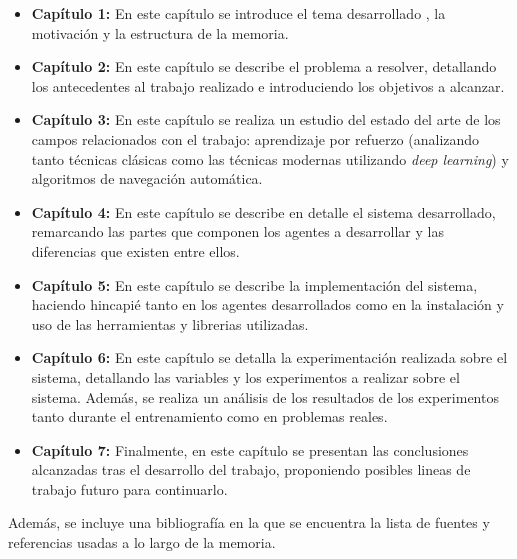 \begin{itemize}
	\item \textbf{Capítulo 1:} En este capítulo se introduce el tema desarrollado , la motivación y la estructura de la memoria.
	\item \textbf{Capítulo 2:} En este capítulo se describe el problema a resolver, detallando los antecedentes al trabajo realizado e introduciendo los objetivos a alcanzar.
	\item \textbf{Capítulo 3:} En este capítulo se realiza un estudio del estado del arte de los campos relacionados con el trabajo: aprendizaje por refuerzo (analizando tanto técnicas clásicas como las técnicas modernas utilizando \textit{deep learning}) y algoritmos de navegación automática.
	\item \textbf{Capítulo 4:} En este capítulo se describe en detalle el sistema desarrollado, remarcando las partes que componen los agentes a desarrollar y las diferencias que existen entre ellos.
	\item \textbf{Capítulo 5:} En este capítulo se describe la implementación del sistema, haciendo hincapié tanto en los agentes desarrollados como en la instalación y uso de las herramientas y librerias utilizadas.
	\item \textbf{Capítulo 6:} En este capítulo se detalla la experimentación realizada sobre el sistema, detallando las variables y los experimentos a realizar sobre el sistema. Además, se realiza un análisis de los resultados de los experimentos tanto durante el entrenamiento como en problemas reales.
	\item \textbf{Capítulo 7:} Finalmente, en este capítulo se presentan las conclusiones alcanzadas tras el desarrollo del trabajo, proponiendo posibles lineas de trabajo futuro para continuarlo.
\end{itemize}

Además, se incluye una bibliografía en la que se encuentra la lista de fuentes y referencias usadas a lo largo de la memoria.

